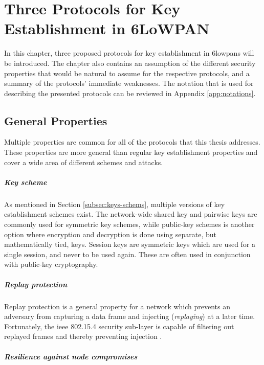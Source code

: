 \chapter{Three Protocols for Key Establishment in 6LoWPAN}
\label{chp:protocols}

In this chapter, three proposed protocols for key establishment in \gls{6lowpan}s will be introduced. The chapter also contains an assumption of the different security properties that would be natural to assume for the respective protocols, and a summary of the protocols' immediate weaknesses. The notation that is used for describing the presented protocols can be reviewed in Appendix \ref{app:notations}.


\section{General Properties}

Multiple properties are common for all of the protocols that this thesis addresses. These properties are more general than regular key establishment properties and cover a wide area of different schemes and attacks.

\paragraph{Key scheme} As mentioned in Section \ref{subsec:keys-schems}, multiple versions of key establishment schemes exist. The network-wide shared key and pairwise keys are commonly used for symmetric key schemes, while public-key schemes is another option where encryption and decryption is done using separate, but mathematically tied, keys. Session keys are symmetric keys which are used for a single session, and never to be used again. These are often used in conjunction with public-key cryptography.

\paragraph{Replay protection} Replay protection is a general property for a network which prevents an adversary from capturing a data frame and injecting (\emph{replaying}) at a later time. Fortunately, the \gls{ieee} 802.15.4 security sub-layer is capable of filtering out replayed frames and thereby preventing injection \cite{krentz20136lowpan}.

\paragraph{Resilience against node compromises}

